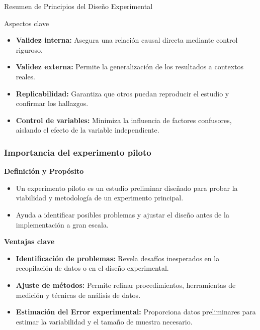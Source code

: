 ﻿\documentclass{beamer}
\begin{document}
\begin{frame}{Resumen de Principios del Diseño Experimental}
\begin{block}{Aspectos clave}
\begin{itemize}
    \item \textbf{Validez interna:} Asegura una relación causal directa mediante control riguroso.
    \item \textbf{Validez externa:} Permite la generalización de los resultados a contextos reales.
    \item \textbf{Replicabilidad:} Garantiza que otros puedan reproducir el estudio y confirmar los hallazgos.
    \item \textbf{Control de variables:} Minimiza la influencia de factores confusores, aislando el efecto de la variable independiente.
\end{itemize}
\end{block}
\end{frame}

\begin{frame}
\frametitle{Importancia del experimento piloto}
\textbf{Definición y Propósito}

\begin{itemize}
    \item Un experimento piloto es un estudio preliminar diseñado para probar la viabilidad y metodología de un experimento principal.
    \item Ayuda a identificar posibles problemas y ajustar el diseño antes de la implementación a gran escala.
\end{itemize}

\textbf{Ventajas clave}

\begin{itemize}
    \item \textbf{Identificación de problemas:} Revela desafíos inesperados en la recopilación de datos o en el diseño experimental.
    \item \textbf{Ajuste de métodos:} Permite refinar procedimientos, herramientas de medición y técnicas de análisis de datos.
    \item \textbf{Estimación del Error experimental:} Proporciona datos preliminares para estimar la variabilidad y el tamaño de muestra necesario.
\end{itemize}
\end{frame}
\end{document}
